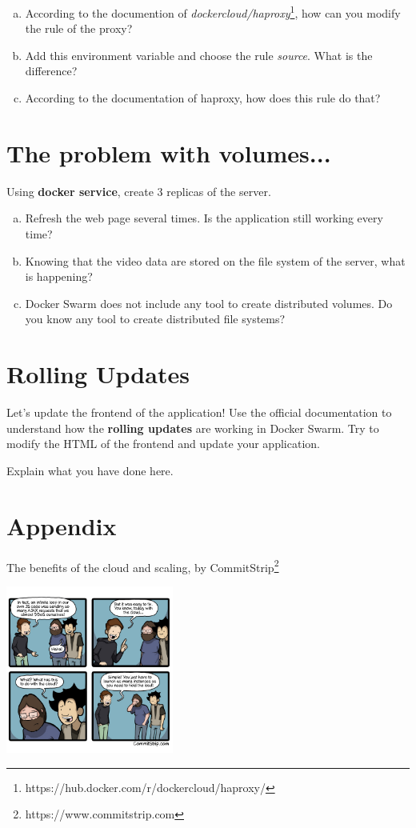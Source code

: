 \documentclass[a4paper,11pt]{exam}
\begin{document}
\begin{questions}
	\question
	\begin{enumerate}[(a)]
		\item According to the documention of \textit{dockercloud/haproxy}\footnote{https://hub.docker.com/r/dockercloud/haproxy/}, how can you modify the rule of the proxy?
		\item Add this environment variable and choose the rule \textit{source}. What is the difference?
		\item According to the documentation of haproxy, how does this rule do that?
	\end{enumerate}
\end{questions}


\section{The problem with volumes...}

\begin{questions}
	\question Using \textbf{docker service}, create 3 replicas of the server.
	\begin{enumerate}[(a)]
		\item Refresh the web page several times. Is the application still working every time?
		\item Knowing that the video data are stored on the file system of the server, what is happening?
		\item Docker Swarm does not include any tool to create distributed volumes. Do you know any tool to create distributed file systems?
	\end{enumerate}
\end{questions}

\section{Rolling Updates}

Let's update the frontend of the application! Use the official documentation to understand how the \textbf{rolling updates} are working in Docker Swarm. Try to modify the HTML of the frontend and update your application.
\begin{questions}
	\question Explain what you have done here.
\end{questions}

\section{Appendix}

The benefits of the cloud and scaling, by CommitStrip\footnote{https://www.commitstrip.com}
\begin{center}
	\includegraphics[width=5.5cm]{fig/commitstripcloudscale.jpg}	
\end{center}
\end{document}
